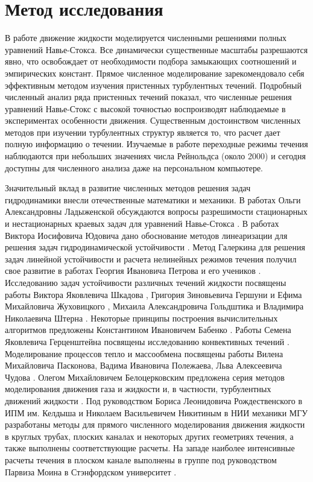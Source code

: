 
\chapter{Метод исследования}

В работе движение жидкости моделируется численными решениями полных уравнений Навье-Стокса. Все динамически существенные масштабы разрешаются явно, что освобождает от необходимости подбора замыкающих соотношений и эмпирических констант. Прямое численное моделирование зарекомендовало себя эффективным методом изучения пристенных турбулентных течений. Подробный численный анализ ряда пристенных течений показал, что численные решения уравнений Навье-Стокс с высокой точностью воспроизводят наблюдаемые в экспериментах особенности движения. Существенным достоинством численных методов при изучении турбулентных структур является то, что расчет дает полную информацию о течении. Изучаемые в работе переходные режимы течения наблюдаются при небольших значениях числа Рейнольдса (около 2000) и сегодня доступны для численного анализа даже на персональном компьютере. 

Значительный вклад в развитие численных методов решения задач гидродинамики внесли отечественные математики и механики. В работах Ольги Александровны Ладыженской обсуждаются вопросы разрешимости стационарных и нестационарных краевых задач для уравнений Навье-Стокса \cite{Lad1970}. В работах Виктора Иосифовича Юдовича дано обоснование методов линеаризации для решения задач гидродинамической устойчивости \cite{Jud1984}. Метод Галеркина для решения задач линейной устойчивости и расчета нелинейных режимов течения получил свое развитие в работах Георгия Ивановича Петрова и его учеников \cite{Petrov1940}. Исследованию задач устойчивости различных течений жидкости посвящены работы Виктора Яковлевича Шкадова \cite{Sch1973, Ach2009}, Григория Зиновьевича Гершуни и Ефима Михайловича Жуховицкого \cite{Ger1972}, Михаила Александровича Гольдштика и Владимира Николаевича Штерна \cite{Gold1977}. Некоторые принципы построения вычислительных алгоритмов предложены Константином Ивановичем Бабенко \cite{Bab2002}. Работы Семена Яковлевича Герценштейна посвящены исследованию конвективных течений \cite{Gerc1973, Gerc1975}. Моделирование процессов тепло и массообмена посвящены работы Вилена Михайловича Пасконова, Вадима Ивановича Полежаева, Льва Алексеевича Чудова \cite{Pask1984, Pol1987}. Олегом Михайловичем Белоцерковским предложена серия методов моделирования движения газа и жидкости и, в частности, турбулентных движений жидкости \cite{Bel1994}. Под руководством Бориса Леонидовича Рождественского в ИПМ им. Келдыша \cite{Rog1973, Rog1984, Pri1987, Rog1987} %
и Николаем Васильевичем Никитиным в НИИ механики МГУ \cite{Nikitin1994a, Nikitin1994b, Nikitin1996, Nikitin2006} разработаны методы для прямого численного моделирования движения жидкости в круглых трубах, плоских каналах и некоторых других геометриях течения, а также выполнены соответствующие расчеты. На западе наиболее интенсивные расчеты течения в плоском канале выполнены в группе под руководством Парвиза Моина в Стэнфордском университет \cite{Moin1978, Moin1982, Kim1987}. 

